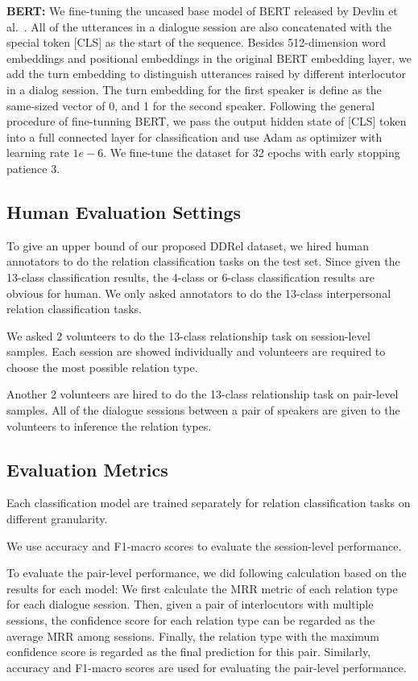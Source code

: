 \textbf{BERT:}
We fine-tuning the uncased base model of BERT released by 
Devlin et al.~. All of the utterances in a dialogue session 
are also concatenated with the special token [CLS] as the start of the sequence. 
Besides 512-dimension word embeddings and positional embeddings in the original BERT 
embedding layer, we add the turn embedding to distinguish utterances raised by different 
interlocutor in a dialog session. The turn embedding for the first speaker is define 
as the same-sized vector of 0, and 1 for the second speaker. 
Following the general procedure of fine-tunning BERT, we pass the output hidden state of 
[CLS] token into a full connected layer for classification and use Adam as optimizer
with learning rate $1e-6$. We fine-tune the dataset for 32 epochs with early stopping
patience 3.


\subsection{Human Evaluation Settings}

To give an upper bound of our proposed DDRel dataset, we hired human annotators to do the relation classification tasks on the test set. Since given the 13-class classification results, the 4-class or 6-class classification results are obvious for human. We only asked annotators to do the 13-class interpersonal relation classification tasks.

We asked 2 volunteers to do the 13-class relationship task on session-level samples.  Each session are showed individually and volunteers are required to choose the most possible relation type. 

Another 2 volunteers are hired to do the 13-class relationship task on pair-level samples. All of the dialogue sessions between a pair of speakers are given to the volunteers to inference the relation types.


\subsection{Evaluation Metrics}
\label{sec:metrics}
Each classification model are trained separately for relation classification tasks on different granularity. 

We use accuracy and F1-macro scores to evaluate the session-level performance.

To evaluate the pair-level performance, we did following calculation based on the results for each model: We first calculate the MRR metric of each relation type for each dialogue session. Then, given a pair of interlocutors with multiple sessions, the confidence score for each relation type can be regarded as the average MRR among sessions. Finally, the relation type with the maximum confidence score is regarded as the final prediction for this pair. Similarly, accuracy and F1-macro scores are used for evaluating the pair-level performance.


